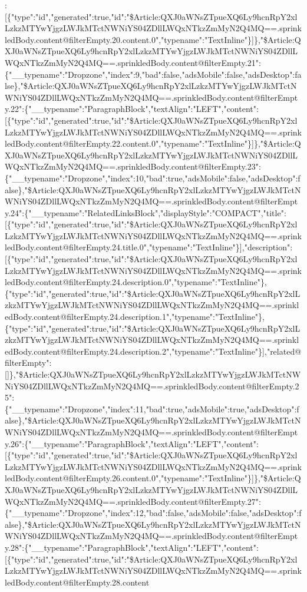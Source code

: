 :{[}\{"type":"id","generated":true,"id":"\$Article:QXJ0aWNsZTpueXQ6Ly9hcnRpY2xlLzkzMTYwYjgzLWJkMTctNWNiYS04ZDllLWQxNTkzZmMyN2Q4MQ==.sprinkledBody.content@filterEmpty.20.content.0","typename":"TextInline"\}{]}\},"\$Article:QXJ0aWNsZTpueXQ6Ly9hcnRpY2xlLzkzMTYwYjgzLWJkMTctNWNiYS04ZDllLWQxNTkzZmMyN2Q4MQ==.sprinkledBody.content@filterEmpty.21":\{"\_\_typename":"Dropzone","index":9,"bad":false,"adsMobile":false,"adsDesktop":false\},"\$Article:QXJ0aWNsZTpueXQ6Ly9hcnRpY2xlLzkzMTYwYjgzLWJkMTctNWNiYS04ZDllLWQxNTkzZmMyN2Q4MQ==.sprinkledBody.content@filterEmpty.22":\{"\_\_typename":"ParagraphBlock","textAlign":"LEFT","content":{[}\{"type":"id","generated":true,"id":"\$Article:QXJ0aWNsZTpueXQ6Ly9hcnRpY2xlLzkzMTYwYjgzLWJkMTctNWNiYS04ZDllLWQxNTkzZmMyN2Q4MQ==.sprinkledBody.content@filterEmpty.22.content.0","typename":"TextInline"\}{]}\},"\$Article:QXJ0aWNsZTpueXQ6Ly9hcnRpY2xlLzkzMTYwYjgzLWJkMTctNWNiYS04ZDllLWQxNTkzZmMyN2Q4MQ==.sprinkledBody.content@filterEmpty.23":\{"\_\_typename":"Dropzone","index":10,"bad":true,"adsMobile":false,"adsDesktop":false\},"\$Article:QXJ0aWNsZTpueXQ6Ly9hcnRpY2xlLzkzMTYwYjgzLWJkMTctNWNiYS04ZDllLWQxNTkzZmMyN2Q4MQ==.sprinkledBody.content@filterEmpty.24":\{"\_\_typename":"RelatedLinksBlock","displayStyle":"COMPACT","title":{[}\{"type":"id","generated":true,"id":"\$Article:QXJ0aWNsZTpueXQ6Ly9hcnRpY2xlLzkzMTYwYjgzLWJkMTctNWNiYS04ZDllLWQxNTkzZmMyN2Q4MQ==.sprinkledBody.content@filterEmpty.24.title.0","typename":"TextInline"\}{]},"description":{[}\{"type":"id","generated":true,"id":"\$Article:QXJ0aWNsZTpueXQ6Ly9hcnRpY2xlLzkzMTYwYjgzLWJkMTctNWNiYS04ZDllLWQxNTkzZmMyN2Q4MQ==.sprinkledBody.content@filterEmpty.24.description.0","typename":"TextInline"\},\{"type":"id","generated":true,"id":"\$Article:QXJ0aWNsZTpueXQ6Ly9hcnRpY2xlLzkzMTYwYjgzLWJkMTctNWNiYS04ZDllLWQxNTkzZmMyN2Q4MQ==.sprinkledBody.content@filterEmpty.24.description.1","typename":"TextInline"\},\{"type":"id","generated":true,"id":"\$Article:QXJ0aWNsZTpueXQ6Ly9hcnRpY2xlLzkzMTYwYjgzLWJkMTctNWNiYS04ZDllLWQxNTkzZmMyN2Q4MQ==.sprinkledBody.content@filterEmpty.24.description.2","typename":"TextInline"\}{]},"related@filterEmpty":{[}{]}\},"\$Article:QXJ0aWNsZTpueXQ6Ly9hcnRpY2xlLzkzMTYwYjgzLWJkMTctNWNiYS04ZDllLWQxNTkzZmMyN2Q4MQ==.sprinkledBody.content@filterEmpty.25":\{"\_\_typename":"Dropzone","index":11,"bad":true,"adsMobile":true,"adsDesktop":false\},"\$Article:QXJ0aWNsZTpueXQ6Ly9hcnRpY2xlLzkzMTYwYjgzLWJkMTctNWNiYS04ZDllLWQxNTkzZmMyN2Q4MQ==.sprinkledBody.content@filterEmpty.26":\{"\_\_typename":"ParagraphBlock","textAlign":"LEFT","content":{[}\{"type":"id","generated":true,"id":"\$Article:QXJ0aWNsZTpueXQ6Ly9hcnRpY2xlLzkzMTYwYjgzLWJkMTctNWNiYS04ZDllLWQxNTkzZmMyN2Q4MQ==.sprinkledBody.content@filterEmpty.26.content.0","typename":"TextInline"\}{]}\},"\$Article:QXJ0aWNsZTpueXQ6Ly9hcnRpY2xlLzkzMTYwYjgzLWJkMTctNWNiYS04ZDllLWQxNTkzZmMyN2Q4MQ==.sprinkledBody.content@filterEmpty.27":\{"\_\_typename":"Dropzone","index":12,"bad":false,"adsMobile":false,"adsDesktop":false\},"\$Article:QXJ0aWNsZTpueXQ6Ly9hcnRpY2xlLzkzMTYwYjgzLWJkMTctNWNiYS04ZDllLWQxNTkzZmMyN2Q4MQ==.sprinkledBody.content@filterEmpty.28":\{"\_\_typename":"ParagraphBlock","textAlign":"LEFT","content":{[}\{"type":"id","generated":true,"id":"\$Article:QXJ0aWNsZTpueXQ6Ly9hcnRpY2xlLzkzMTYwYjgzLWJkMTctNWNiYS04ZDllLWQxNTkzZmMyN2Q4MQ==.sprinkledBody.content@filterEmpty.28.content